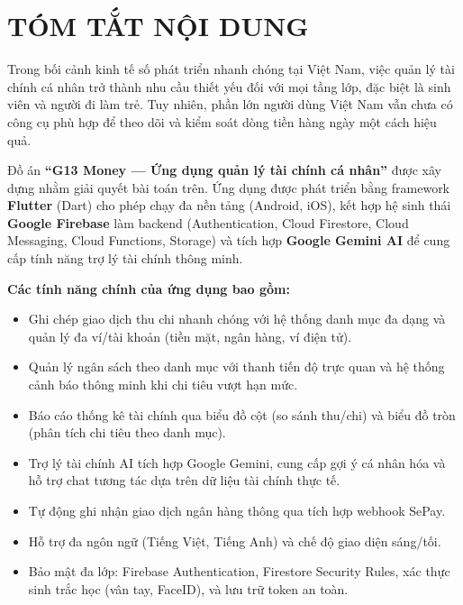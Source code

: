 \chapter*{TÓM TẮT NỘI DUNG}

Trong bối cảnh kinh tế số phát triển nhanh chóng tại Việt Nam, việc quản lý tài chính cá nhân trở thành nhu cầu thiết yếu đối với mọi tầng lớp, đặc biệt là sinh viên và người đi làm trẻ. Tuy nhiên, phần lớn người dùng Việt Nam vẫn chưa có công cụ phù hợp để theo dõi và kiểm soát dòng tiền hàng ngày một cách hiệu quả.

Đồ án \textbf{``G13 Money --- Ứng dụng quản lý tài chính cá nhân''} được xây dựng nhằm giải quyết bài toán trên. Ứng dụng được phát triển bằng framework \textbf{Flutter} (Dart) cho phép chạy đa nền tảng (Android, iOS), kết hợp hệ sinh thái \textbf{Google Firebase} làm backend (Authentication, Cloud Firestore, Cloud Messaging, Cloud Functions, Storage) và tích hợp \textbf{Google Gemini AI} để cung cấp tính năng trợ lý tài chính thông minh.

\textbf{Các tính năng chính của ứng dụng bao gồm:}

\begin{itemize}[noitemsep]
  \item Ghi chép giao dịch thu chi nhanh chóng với hệ thống danh mục đa dạng và quản lý đa ví/tài khoản (tiền mặt, ngân hàng, ví điện tử).
  \item Quản lý ngân sách theo danh mục với thanh tiến độ trực quan và hệ thống cảnh báo thông minh khi chi tiêu vượt hạn mức.
  \item Báo cáo thống kê tài chính qua biểu đồ cột (so sánh thu/chi) và biểu đồ tròn (phân tích chi tiêu theo danh mục).
  \item Trợ lý tài chính AI tích hợp Google Gemini, cung cấp gợi ý cá nhân hóa và hỗ trợ chat tương tác dựa trên dữ liệu tài chính thực tế.
  \item Tự động ghi nhận giao dịch ngân hàng thông qua tích hợp webhook SePay.
  \item Hỗ trợ đa ngôn ngữ (Tiếng Việt, Tiếng Anh) và chế độ giao diện sáng/tối.
  \item Bảo mật đa lớp: Firebase Authentication, Firestore Security Rules, xác thực sinh trắc học (vân tay, FaceID), và lưu trữ token an toàn.
\end{itemize}

